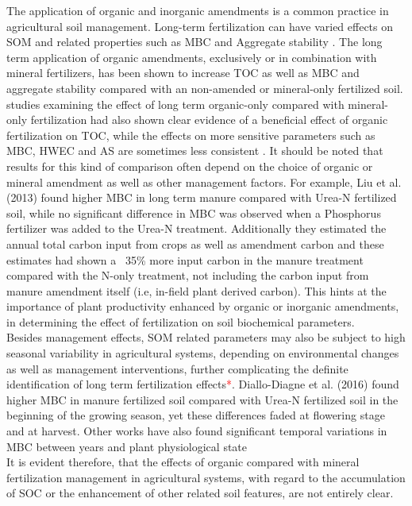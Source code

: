 \documentclass[12pt]{report}
\newcommand{\myRed}[1]{\textcolor{red}{#1}} %
\begin{document}
 		The application of organic and inorganic amendments is a common practice in agricultural soil management. Long-term fertilization can have varied effects on SOM and related properties such as MBC and Aggregate stability \citep{}. 
 		The long term application of organic amendments, exclusively or in combination with mineral fertilizers, has been shown to increase TOC \citep{heinze2010, yang2012} as well as MBC \citep{luo2015, marschner2003a}and aggregate stability\citep{ huang2010, yu2012} compared with an non-amended or mineral-only fertilized soil.
 		studies examining the effect of long term organic-only compared with mineral-only fertilization had  also shown clear evidence of a beneficial effect of organic fertilization on TOC\citep{santos2012, luo2015}, while the effects on more sensitive parameters such as MBC, HWEC and AS are sometimes less consistent \citep{albiach2001, mahmood1997}. It should be noted that results for this kind of comparison often depend on the choice of organic or mineral amendment as well as other management factors.    
 		For example, Liu et al. (2013) found  higher MBC in long term manure compared with Urea-N fertilized soil, while no significant difference in MBC was observed when a Phosphorus fertilizer was added to the Urea-N treatment. Additionally they estimated the annual total carbon input from crops as well as amendment carbon and these estimates had shown a ~35\% more input carbon in the manure treatment compared with the N-only treatment, not including the carbon input from manure amendment itself (i.e, in-field plant derived carbon). This hints at the importance  of plant productivity enhanced by organic or inorganic amendments, in determining the  effect of fertilization on soil biochemical parameters.\\
 		Besides management effects, SOM  related parameters may also be subject to high seasonal variability in agricultural systems, depending on environmental changes as well as management interventions, further complicating the definite identification of long term fertilization effects\myRed{*}. 
 		Diallo-Diagne et al. (2016) found higher MBC in manure fertilized soil compared with Urea-N fertilized soil in the beginning of the growing season, yet these differences faded at flowering stage and at harvest. Other works have also found significant temporal variations in MBC between years \citep{kaiser1995} and plant physiological state\citep{jat2020, }\\ 
		It is evident therefore, that the effects of organic compared with mineral fertilization management in agricultural systems, with regard to the accumulation of SOC or the enhancement of other related soil features, are not entirely clear. 
		
\end{document}

